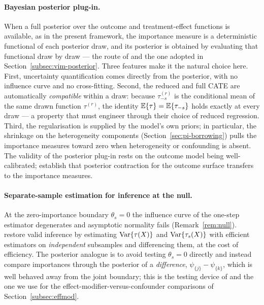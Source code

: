 \paragraph{Bayesian posterior plug-in.}
When a full posterior over the outcome and treatment-effect functions is
available, as in the present framework, the importance measure is a
deterministic functional of each posterior draw, and its posterior is obtained
by evaluating that functional draw by draw --- the route of \citet{shin2024} and
the one adopted in Section~\ref{subsec:vim-posterior}. Three features make it the
natural choice here. First, uncertainty quantification comes directly from the
posterior, with no influence curve and no cross-fitting. Second, the reduced and
full CATE are automatically \emph{compatible} within a draw: because
$\tau^{(r)}_{-s}$ is the conditional mean of the same drawn function
$\tau^{(r)}$, the identity $\mathbb{E}\{\tau\} = \mathbb{E}\{\tau_{-s}\}$ holds exactly at every
draw --- a property that \citet{hines2022} must engineer through their choice of
reduced regression. Third, the regularisation is supplied by the model's own
priors; in particular, the shrinkage on the heterogeneity components
(Section~\ref{sec:pi-borrowing}) pulls the importance measures toward zero when
heterogeneity or confounding is absent. The validity of the posterior plug-in
rests on the outcome model being well-calibrated; \citet{shin2024} establish
that posterior contraction for the outcome surface transfers to the importance
measures.

\paragraph{Separate-sample estimation for inference at the null.}
At the zero-importance boundary $\theta_s = 0$ the influence curve of the
one-step estimator degenerates and asymptotic normality fails
(Remark~\ref{rem:null}). \citet{hines2022} restore valid inference by estimating
$\mathrm{Var}\{\tau(X)\}$ and $\mathrm{Var}\{\tau_s(X)\}$ with efficient estimators on
\emph{independent} subsamples and differencing them, at the cost of efficiency.
The posterior analogue is to avoid testing $\theta_s = 0$ directly and instead
compare importances through the posterior of a \emph{difference},
$\psi_{\{j\}} - \psi_{\{k\}}$, which is well behaved away from the joint
boundary; this is the testing device of \citet{shin2024} and the one we use for
the effect-modifier-versus-confounder comparisons of
Section~\ref{subsec:effmod}.

